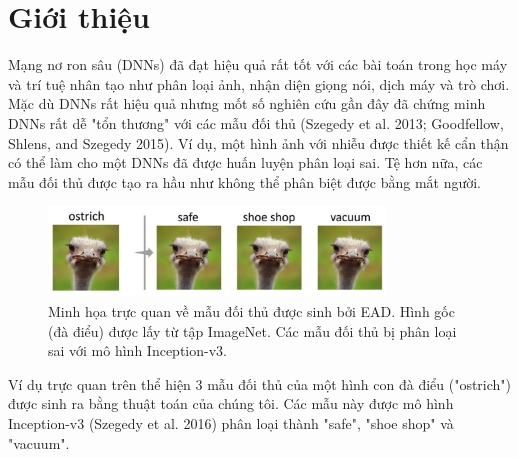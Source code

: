\chapter{Giới thiệu}
Mạng nơ ron sâu (DNNs) đã đạt hiệu quả rất tốt với các bài toán trong học máy
và trí tuệ nhân tạo như phân loại ảnh, nhận diện giọng nói, dịch máy và trò chơi.
Mặc dù DNNs rất hiệu quả nhưng mốt số nghiên cứu gần đây đã chứng minh DNNs rất 
dễ  "tổn thương" với các mẫu đối thủ (Szegedy et al. 2013; Goodfellow, Shlens, 
and Szegedy 2015). Ví dụ, một hình ảnh với nhiễu được thiết kế cẩn thận có thể
làm cho một DNNs đã được huấn luyện phân loại sai. Tệ hơn nữa, các mẫu đối thủ
được tạo ra hầu như không thể phân biệt được bằng mắt người. 
\begin{figure}[H] %
    \centering %
    \includegraphics[width=0.8\textwidth]{assets/fig_01.png} 
    \caption{Minh họa trực quan về mẫu đối thủ được sinh bởi EAD. 
    Hình gốc (đà điểu) được lấy từ tập ImageNet. Các mẫu đối thủ bị 
    phân loại sai với mô hình Inception-v3.} %
    \label{fig:fg_01}
\end{figure}
Ví dụ trực quan trên thể hiện 3 mẫu đối thủ của một hình con đà điểu ("ostrich") 
được sinh ra bằng thuật toán của chúng tôi. Các mẫu này được mô hình Inception-v3 
(Szegedy et al. 2016) phân loại thành "safe", "shoe shop" và "vacuum".